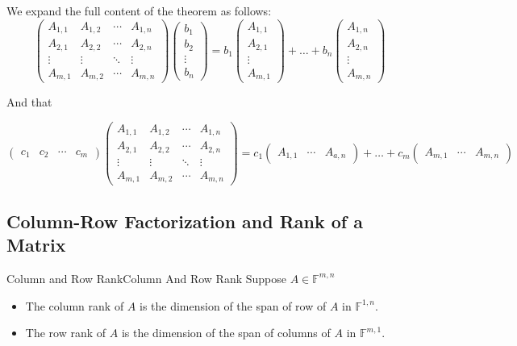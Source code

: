 \documentclass[../main.tex]{subfiles}
\begin{document}
We expand the full content of the theorem as follows:
\begin{equation}
\begin{pmatrix}
A_{1,1} & A_{1,2} & \cdots & A_{1,n}\\
A_{2,1} & A_{2,2} & \cdots & A_{2,n}\\
\vdots & \vdots & \ddots & \vdots \\
A_{m,1} & A_{m,2} & \cdots & A_{m,n}
\end{pmatrix}
\begin{pmatrix}
b_1\\b_2\\\vdots \\b_n
\end{pmatrix}
=
b_1
\begin{pmatrix}
A_{1,1}\\A_{2,1}\\\vdots \\A_{m,1}
\end{pmatrix}
+\ldots +
b_n
\begin{pmatrix}
A_{1,n}\\A_{2,n}\\\vdots \\A_{m,n}
\end{pmatrix}
\end{equation}

And that

\begin{equation*}
\begin{pmatrix}
	c_1&c_2&\cdots &c_m
\end{pmatrix}
\begin{pmatrix}
A_{1,1} & A_{1,2} & \cdots & A_{1,n}\\
A_{2,1} & A_{2,2} & \cdots & A_{2,n}\\
\vdots & \vdots & \ddots & \vdots \\
A_{m,1} & A_{m,2} & \cdots & A_{m,n}
\end{pmatrix}
=
c_1
\begin{pmatrix}
	A_{1,1}&\cdots &A_{a,n}
\end{pmatrix}
+\ldots +
c_m
\begin{pmatrix}
	A_{m,1}&\cdots &A_{m,n}
\end{pmatrix}
\end{equation*}

\subsection{Column-Row Factorization and Rank of a Matrix}
\begin{definition}{Column and Row Rank}{Column And Row Rank}
Suppose $A\in \mathbb{F}^{m,n}$
\begin{itemize}
\item The column rank of $A$ is the dimension of the span of row of $A$ in $\mathbb{F}^{1,n}$.
\item The row rank of $A$ is the dimension of the span of columns of $A$ in $\mathbb{F}^{m,1}$.
\end{itemize}
\end{definition}
\end{document}
